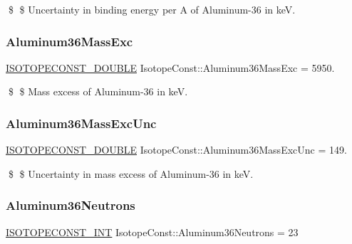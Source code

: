 \$ \$ Uncertainty in binding energy per A of Aluminum-\/36 in keV. \mbox{\label{group___isotope_const-_aluminum-_al36_ga4217deaa9f32c25773d619b416627e2b}} 
\subsubsection{\texorpdfstring{Aluminum36\+Mass\+Exc}{Aluminum36MassExc}}
{\footnotesize\ttfamily \mbox{\hyperlink{group___isotope_const-_macros_ga8f45a7272ce02c0b4c65c44636ed719a}{I\+S\+O\+T\+O\+P\+E\+C\+O\+N\+S\+T\+\_\+\+D\+O\+U\+B\+LE}} Isotope\+Const\+::\+Aluminum36\+Mass\+Exc = 5950.}

\$ \$ Mass excess of Aluminum-\/36 in keV. \mbox{\label{group___isotope_const-_aluminum-_al36_ga16deb1c411d91becc63dd1228c253b55}} 
\subsubsection{\texorpdfstring{Aluminum36\+Mass\+Exc\+Unc}{Aluminum36MassExcUnc}}
{\footnotesize\ttfamily \mbox{\hyperlink{group___isotope_const-_macros_ga8f45a7272ce02c0b4c65c44636ed719a}{I\+S\+O\+T\+O\+P\+E\+C\+O\+N\+S\+T\+\_\+\+D\+O\+U\+B\+LE}} Isotope\+Const\+::\+Aluminum36\+Mass\+Exc\+Unc = 149.}

\$ \$ Uncertainty in mass excess of Aluminum-\/36 in keV. \mbox{\label{group___isotope_const-_aluminum-_al36_gaaf6a0820f170bb4db19548ccf9c10389}} 
\subsubsection{\texorpdfstring{Aluminum36\+Neutrons}{Aluminum36Neutrons}}
{\footnotesize\ttfamily \mbox{\hyperlink{group___isotope_const-_macros_ga5f18360b3e99483a35c32d789e62621c}{I\+S\+O\+T\+O\+P\+E\+C\+O\+N\+S\+T\+\_\+\+I\+NT}} Isotope\+Const\+::\+Aluminum36\+Neutrons = 23}

